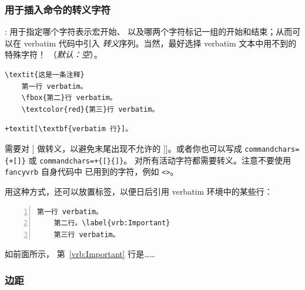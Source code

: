 \documentclass[twoside]{article}
\newif\ifChangeBar \ChangeBarfalse
\providecommand\optname[1]{\textsf{#1}}
\newenvironment{optlist}{\begin{description}%
  \renewcommand\makelabel[1]{%
    \descriptionlabel{\mdseries\optname{##1}}}%
  \itemsep0.25\itemsep}%
 {\end{description}}
\begin{document}
\subsubsection{用于插入命令的转义字符}

\begin{optlist}
  \item[commandchars (three characters)]: 用于指定哪个字符表示宏开始、
  以及哪两个字符标记一组的开始和结束；从而可以在 verbatim 代码中引入
  \emph{转义}序列。当然，最好选择 verbatim 文本中用不到的特殊字符！
  （\emph{默认：空}）。
  \label{sec:commandchars}
\end{optlist}

\begin{SideBySideExample}
  \begin{Verbatim}[commandchars=\\\{\}]
    \textit{这是一条注释}
    第一行 verbatim。
    \fbox{第二}行 verbatim。
    \textcolor{red}{第三}行 verbatim。
  \end{Verbatim}

  \begin{Verbatim}[commandchars=+\[\]]
    +textit[\textbf{verbatim 行}]。
  \end{Verbatim}
\end{SideBySideExample}


需要对 ] 做转义，以避免末尾出现不允许的 ]]。或者你也可以写成
\verb|commandchars={+[]}| 或 \verb|commandchars=+{[}{]}|。
对所有活动字符都需要转义。注意不要使用 \texttt{fancyvrb} 自身代码中
已用到的字符，例如 \verb|<>|。




\ifChangeBar\begin{changebar}\fi
  用这种方式，还可以放置标签，以便日后引用 verbatim 环境中的某些行：

\begin{SideBySideExample}
  \begin{Verbatim}[commandchars=\\\{\},
         numbers=left,numbersep=2pt]
    第一行 verbatim。
    第二行。\label{vrb:Important}
    第三行 verbatim。
  \end{Verbatim}

    如前面所示，
  第~\ref{vrb:Important} 行是……
\end{SideBySideExample}
\ifChangeBar\end{changebar}\fi


\subsubsection{边距}
\end{document}
